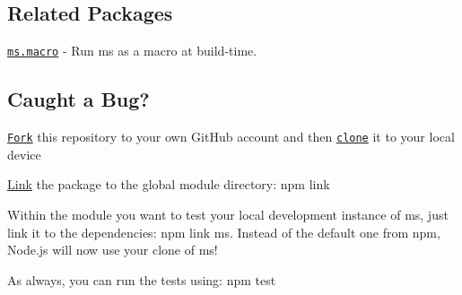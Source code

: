 \subsection*{Related Packages}


\begin{DoxyItemize}
\item \href{https://github.com/knpwrs/ms.macro}{\tt ms.\+macro} -\/ Run {\ttfamily ms} as a macro at build-\/time.
\end{DoxyItemize}

\subsection*{Caught a Bug?}


\begin{DoxyEnumerate}
\item \href{https://help.github.com/articles/fork-a-repo/}{\tt Fork} this repository to your own Git\+Hub account and then \href{https://help.github.com/articles/cloning-a-repository/}{\tt clone} it to your local device
\item \mbox{\hyperlink{structLink}{Link}} the package to the global module directory\+: {\ttfamily npm link}
\item Within the module you want to test your local development instance of ms, just link it to the dependencies\+: {\ttfamily npm link ms}. Instead of the default one from npm, Node.\+js will now use your clone of ms!
\end{DoxyEnumerate}

As always, you can run the tests using\+: {\ttfamily npm test} 